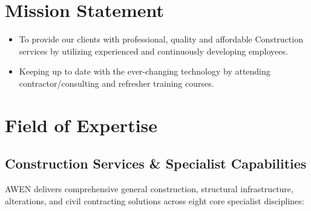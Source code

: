 \documentclass[a4paper,11pt]{article}
\providecommand{\faCheckSquare}{\faCheck}
\begin{document}
\section{Mission Statement}

\begin{tcolorbox}[
  enhanced, colback=white, colframe=awenMidGrey, 
  boxrule=0.8pt, arc=4pt, top=10pt, bottom=10pt, left=12pt, right=12pt
]
\begin{itemize}[label=\textcolor{awenGold}{\faCheckSquare}, itemsep=6pt, font=\color{awenDarkGrey}]
  \item To provide our clients with professional, quality and affordable Construction services by utilizing experienced and continuously developing employees.
  \item Keeping up to date with the ever-changing technology by attending contractor/consulting and refresher training courses.
\end{itemize}
\end{tcolorbox}

\newpage

\section{Field of Expertise}

\subsection{Construction Services \& Specialist Capabilities}

\color{awenDarkGrey}
AWEN delivers comprehensive general construction, structural infrastructure, alterations, and civil contracting solutions across eight core specialist disciplines:

\vspace{0.35cm}
\end{document}
